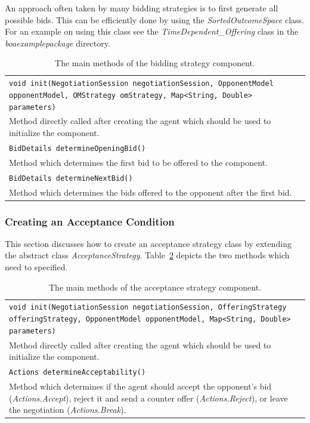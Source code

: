 \documentclass[]{article}
\begin{document}
An approach often taken by many bidding strategies is to first generate all possible bids. This can be efficiently done by using the \textit{SortedOutcomeSpace} class. For an example on using this class see the \textit{TimeDependent\_Offering} class in the \textit{boaexamplepackage} directory.

\begin{table}[h]
\begin{tabular}{m{}}
\hline
\texttt{void init(NegotiationSession negotiationSession, OpponentModel opponentModel, 
	OMStrategy omStrategy, Map<String, Double> parameters)}\\
Method directly called after creating the agent which should be used to initialize the component.\\
\hline
\texttt{BidDetails determineOpeningBid()}\\
Method which determines the first bid to be offered to the component.\\
\hline
\texttt{BidDetails determineNextBid()}\\
Method which determines the bids offered to the opponent after the first bid.\\
\hline
\end{tabular}
\caption{The main methods of the bidding strategy component.}
\label{tab:BOAbs}
\end{table}


\subsubsection{Creating an Acceptance Condition}
This section discusses how to create an acceptance strategy class by extending the abstract class \textit{AcceptanceStrategy}. Table~\ref{tab:BOAas} depicts the two methods which need to specified.

\begin{table}[h]
\begin{tabular}{m{}}
\hline
\texttt{void init(NegotiationSession negotiationSession, OfferingStrategy offeringStrategy,
			OpponentModel opponentModel, Map<String, Double> parameters)}\\
Method directly called after creating the agent which should be used to initialize the component.\\
\hline
\texttt{Actions determineAcceptability()}\\
Method which determines if the agent should accept the opponent's bid (\textit{Actions.Accept}), reject it and send a counter offer (\textit{Actions.Reject}), or leave the negotiation (\textit{Actions.Break}).\\
\hline
\end{tabular}
\caption{The main methods of the acceptance strategy component.}
\label{tab:BOAas}
\end{table}
\end{document}
